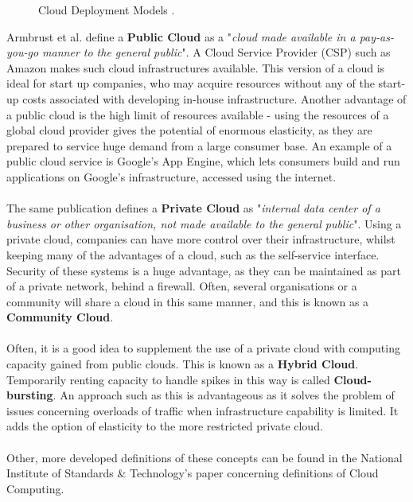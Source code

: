 \begin{figure}[ht]
\centering
{}
\caption[An example figure.]{Cloud Deployment Models \cite{dialogiccloud}.}
\end{figure}

Armbrust et al. \cite{armbrustberkeleyview} define a \textbf{Public Cloud} as a "\textit{cloud made available in a pay-as-you-go manner to the general public}". A Cloud Service Provider (CSP) such as Amazon makes such cloud infrastructures available. This version of a cloud is ideal for start up companies, who may acquire resources without any of the start-up costs associated with developing in-house infrastructure\cite{amazonwhatiscloudcomputing}. Another advantage of a public cloud is the high limit of resources available - using the resources of a global cloud provider gives the potential of enormous elasticity, as they are prepared to service huge demand from a large consumer base. An example of a public cloud service is Google's App Engine, which lets consumers build and run applications on Google's infrastructure, accessed using the internet\cite{googleappengine}. \\ \\
The same publication \cite{armbrustberkeleyview} defines a \textbf{Private Cloud} as "\textit{internal data center of a business or other organisation, not made available to the general public}". Using a private cloud, companies can have more control over their infrastructure, whilst keeping many of the advantages of a cloud, such as the self-service interface. Security of these systems is a huge advantage, as they can be maintained as part of a private network, behind a firewall. Often, several organisations or a community will share a cloud in this same manner, and this is known as a \textbf{Community Cloud}\cite{armbrustberkeleyview}. \\ \\ 
Often, it is a good idea to supplement the use of a private cloud with computing capacity gained from public clouds. This is known as a \textbf{Hybrid Cloud}\cite{vimprivatehybrid}. Temporarily renting capacity to handle spikes in this way is called \textbf{Cloud-bursting}\cite{whereisthecloud}. An approach such as this is advantageous as it solves the problem of issues concerning overloads of traffic when infrastructure capability is limited. It adds the option of elasticity to the more restricted private cloud. \\ \\
Other, more developed definitions of these concepts can be found in the National Institute of Standards \& Technology's paper concerning definitions of Cloud Computing\cite{nistcloud}. 

